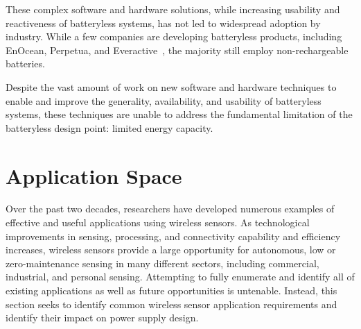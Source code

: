 These complex software and hardware solutions, while increasing usability and reactiveness of batteryless systems, has not led to widespread adoption by industry.
While a few companies are developing batteryless products, including EnOcean, Perpetua, and Everactive~\cite{enocean, perpetua, everactive}, the majority still employ non-rechargeable batteries.

Despite the vast amount of work on new software and hardware techniques to enable and improve the generality, availability, and usability of batteryless systems, these techniques are unable to address the fundamental limitation of the batteryless design point: limited energy capacity.


\section{Application Space}
Over the past two decades, researchers have developed numerous examples of effective and useful applications using wireless sensors.
As technological improvements in sensing, processing, and connectivity capability and efficiency increases, wireless sensors provide a large opportunity for autonomous, low or zero-maintenance sensing in many different sectors, including commercial, industrial, and personal sensing.
Attempting to fully enumerate and identify all of existing applications as well as future opportunities is untenable.
Instead, this section seeks to identify common wireless sensor application requirements and identify their impact on power supply design.

